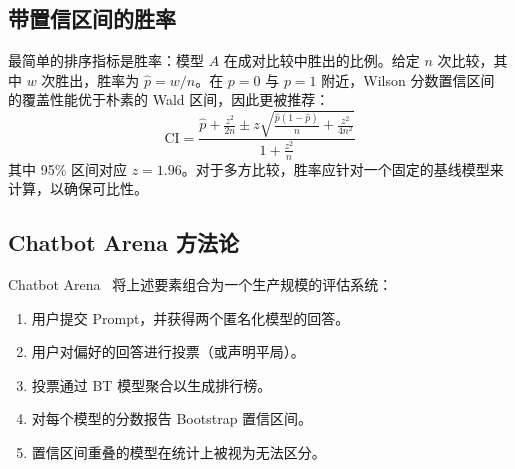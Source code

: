 \subsection{带置信区间的胜率}
\label{win-rate-with-confidence-intervals}

最简单的排序指标是胜率：模型 $A$ 在成对比较中胜出的比例。给定 $n$ 次比较，其中 $w$ 次胜出，胜率为 $\hat{p} = w/n$。在 $p = 0$ 与 $p = 1$ 附近，Wilson 分数置信区间~\cite{wilson1927probable} 的覆盖性能优于朴素的 Wald 区间，因此更被推荐：
\begin{equation}
    \text{CI} = \frac{\hat{p} + \frac{z^2}{2n} \pm z\sqrt{\frac{\hat{p}(1-\hat{p})}{n} + \frac{z^2}{4n^2}}}{1 + \frac{z^2}{n}}
\end{equation}
其中 95\% 区间对应 $z = 1.96$。对于多方比较，胜率应针对一个固定的基线模型来计算，以确保可比性。

\subsection{Chatbot Arena 方法论}
\label{chatbot-arena-methodology}

Chatbot Arena~\cite{zheng2023judging} 将上述要素组合为一个生产规模的评估系统：

\begin{enumerate}
  \item 用户提交 Prompt，并获得两个匿名化模型的回答。
  \item 用户对偏好的回答进行投票（或声明平局）。
  \item 投票通过 BT 模型聚合以生成排行榜。
  \item 对每个模型的分数报告 Bootstrap 置信区间。
  \item 置信区间重叠的模型在统计上被视为无法区分。
\end{enumerate}

